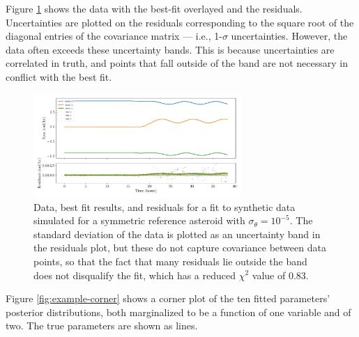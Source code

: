\documentclass[linenumbers]{aastex631}
\begin{document}
Figure \ref{fig:example-residuals} shows the data with the best-fit overlayed and the residuals. Uncertainties are plotted on the residuals corresponding to the square root of the diagonal entries of the covariance matrix --- i.e., 1-$\sigma$ uncertainties. However, the data often exceeds these uncertainty bands. This is because uncertainties are correlated in truth, and points that fall outside of the band are not necessary in conflict with the best fit.

\begin{figure}
  \centering
  \includegraphics[width=0.7\textwidth]{example-residuals.pdf}
  \caption{Data, best fit results, and residuals for a fit to synthetic data simulated for a symmetric reference asteroid with $\sigma_\theta = 10^{-5}$. The standard deviation of the data is plotted as an uncertainty band in the residuals plot, but these do not capture covariance between data points, so that the fact that many residuals lie outside the band does not disqualify the fit, which has a reduced $\chi^2$ value of 0.83.}
  \label{fig:example-residuals}
\end{figure}

Figure \ref{fig:example-corner} shows a corner plot of the ten fitted parameters' posterior distributions, both marginalized to be a function of one variable and of two. The true parameters are shown as lines.
\end{document}
